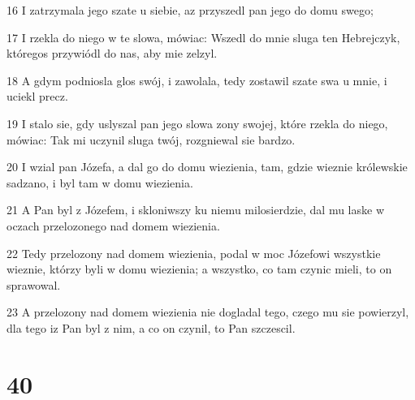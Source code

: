 \par 16 I zatrzymala jego szate u siebie, az przyszedl pan jego do domu swego;
\par 17 I rzekla do niego w te slowa, mówiac: Wszedl do mnie sluga ten Hebrejczyk, któregos przywiódl do nas, aby mie zelzyl.
\par 18 A gdym podniosla glos swój, i zawolala, tedy zostawil szate swa u mnie, i uciekl precz.
\par 19 I stalo sie, gdy uslyszal pan jego slowa zony swojej, które rzekla do niego, mówiac: Tak mi uczynil sluga twój, rozgniewal sie bardzo.
\par 20 I wzial pan Józefa, a dal go do domu wiezienia, tam, gdzie wieznie królewskie sadzano, i byl tam w domu wiezienia.
\par 21 A Pan byl z Józefem, i skloniwszy ku niemu milosierdzie, dal mu laske w oczach przelozonego nad domem wiezienia.
\par 22 Tedy przelozony nad domem wiezienia, podal w moc Józefowi wszystkie wieznie, którzy byli w domu wiezienia; a wszystko, co tam czynic mieli, to on sprawowal.
\par 23 A przelozony nad domem wiezienia nie dogladal tego, czego mu sie powierzyl, dla tego iz Pan byl z nim, a co on czynil, to Pan szczescil.

\chapter{40}


